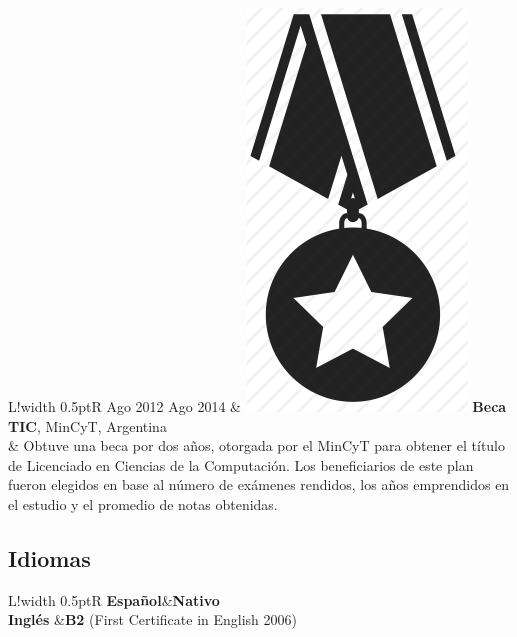\documentclass[10pt]{article}
\newcommand\VRule{\color{lightgray}\vrule width 0.5pt}
\begin{document}
\begin{tabular}{L!{\VRule}R}
Ago 2012 Ago 2014 & \includegraphics[scale=0.022]{../img/medal.png} 
\textbf{Beca TIC}, MinCyT, Argentina\\
& \vspace{-0.7cm} Obtuve una beca por dos años, otorgada por el MinCyT para obtener el título de 
Licenciado en Ciencias de la Computación. Los beneficiarios de este plan fueron
elegidos en base al número de exámenes rendidos, los años emprendidos en el estudio y el promedio de notas obtenidas.\\

\end{tabular}


\subsection*{Idiomas}

\begin{tabular}{L!{\VRule}R}
{\bf Español}&{\bf Nativo}\\
{\bf Inglés }&{\bf B2} (First Certificate in English 2006)\\
\end{tabular}
\end{document}
